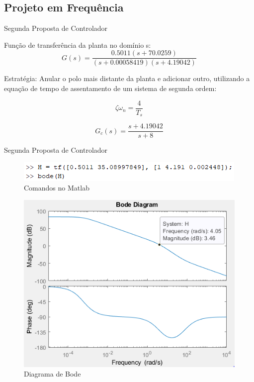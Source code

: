 \documentclass{beamer}
\begin{document}
\subsection{Projeto em Frequência}

\begin{frame}{Segunda Proposta de Controlador}

Função de transferência da planta no domínio s:
\begin{equation}
G(s) = \frac{0.5011(s+70.0259)}{(s+0.00058419)(s+4.19042)}
\label{equacao_s}
\end{equation}

Estratégia: Anular o polo mais distante da planta e adicionar outro, utilizando a equação de tempo de assentamento de um sistema de segunda ordem:

\begin{equation}
\zeta \omega_{n}=\frac{4}{T_{s}}
\label{assentamento_eq}
\end{equation}

\begin{equation}
G_{c}(s)=\frac{s+4.19042}{s+8}
\label{novogc}
\end{equation}
\end{frame}

\begin{frame}{Segunda Proposta de Controlador}

\begin{figure}[H]
    \centering
    \includegraphics[width=0.7\linewidth]{src/tex/img/bode_comandos.PNG}
    \caption{Comandos no Matlab}
    \label{fig:lgr}
\end{figure}

\begin{figure}[H]
    \centering
    \includegraphics[width=0.6\linewidth]{src/tex/img/bode.PNG}
    \caption{Diagrama de Bode}
    \label{fig:lgr}
\end{figure}

\end{frame}
\end{document}

